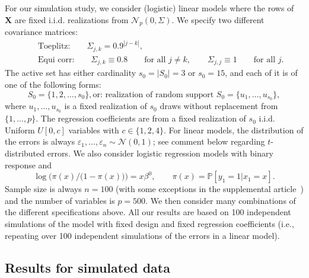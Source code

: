 \documentclass[aos,MSNbibl,dvips]{arximspdf}
\def\cal{\mathcal}
\newcommand{\PP}{\mathbb{P}}
\newcommand{\eps}{\varepsilon}
\newcommand{\bx}{\mathbf{X}}
\begin{document}
For our simulation study, we consider (logistic) linear
models where the rows of
$\bx$ are fixed i.i.d. realizations from ${\cal N}_p(0,\Sigma)$. We specify
two different covariance matrices:
%
\begin{eqnarray*}
&&\mbox{Toeplitz:}\qquad \Sigma_{j,k} = 0.9^{|j-k|},
\\
&&\mbox{Equi corr:}\qquad\Sigma_{j,k}
\equiv0.8\qquad \mbox{for all } j \neq k,\qquad \Sigma_{j,j} \equiv1\qquad
\mbox{for all }
j.
\end{eqnarray*}
%
The active set has either cardinality $s_0 = |S_0| = 3$ or $s_0 = 15$, and
each of it is of one of the following forms:
%
\[
S_0 = \{1,2,\ldots,s_0\}, \mbox{or: realization of
random support } S_0= \{u_1,\ldots,u_{s_0}\},
\]
%
where $u_1,\ldots,u_{s_0}$ is a fixed realization of $s_0$ draws without
replacement from $\{1,\ldots,p\}$. The regression coefficients are from
a fixed realization of $s_0$ i.i.d. Uniform $U[0,c]$ variables with $c
\in
\{1,2,4\}$.
For linear models, the distribution of the errors is always $\eps
_1,\ldots,\eps_n \sim{\cal N}(0,1)$; see comment below regarding
$t$-distributed errors. We also consider logistic regression models with
binary response and
%
\[
\log\bigl(\pi(x)/\bigl(1 - \pi(x)\bigr)\bigr) = x \beta^0,\qquad \pi(x) =
\PP[y_1=1|x_1=x].
\]
%
Sample size is always $n = 100$ (with some exceptions in the
supplemental article~\cite{supplement}) and the number of variables is
$p = 500$. We
then consider many combinations of the different specifications above. All
our results are based on 100 independent simulations of the model with
fixed design and fixed regression
coefficients (i.e.,
repeating over 100 independent simulations of the errors in a linear model).

\subsection{Results for simulated data}

\end{document}
